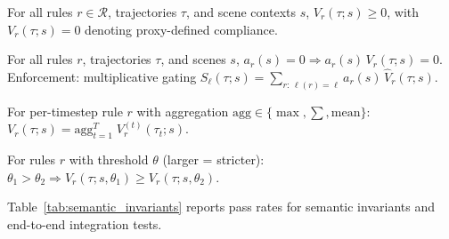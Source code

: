 \begin{definition}
For all rules $r\in\mathcal{R}$, trajectories $\tau$, and scene contexts $s$, $V_r(\tau; s) \ge 0$, with $V_r(\tau; s)=0$ denoting proxy-defined compliance.
\end{definition}

\begin{definition}
For all rules $r$, trajectories $\tau$, and scenes $s$, $a_r(s)=0 \Rightarrow a_r(s)\,V_r(\tau;s)=0$. Enforcement: multiplicative gating $S_\ell(\tau;s)=\sum_{r:\,\ell(r)=\ell} a_r(s)\,\hat{V}_r(\tau;s)$.
\end{definition}

\begin{definition}
For per-timestep rule $r$ with aggregation $\mathrm{agg}\in\{\max,\sum,\mathrm{mean}\}$: $V_r(\tau;s)=\mathrm{agg}_{t=1}^{T}\; V_r^{(t)}(\tau_t;s)$.
\end{definition}

\begin{definition}[Monotonicity]
For rules $r$ with threshold $\theta$ (larger = stricter): $\theta_1>\theta_2 \Rightarrow V_r(\tau;s,\theta_1)\ge V_r(\tau;s,\theta_2)$.
\end{definition}

\noindent
Table~\ref{tab:semantic_invariants} reports pass rates for semantic invariants and end-to-end integration tests.

